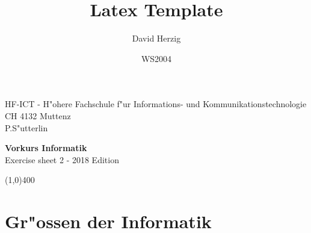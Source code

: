 \documentclass[a4paper,10pt]{article}
\title{Latex Template}
\author{David Herzig}
\date{WS2004}
\begin{document}
HF-ICT - H"ohere Fachschule f"ur Informations- und Kommunikationstechnologie\\
CH 4132 Muttenz\\
P.S"utterlin

\vspace{2mm}

\begin{center}
{\Large \bf Vorkurs Informatik}\\
Exercise sheet 2 - 2018 Edition
\end{center}

\vspace{2mm}

\line(1,0){400}

\vspace{5mm}

\section{Gr"ossen der Informatik}
\end{document}
